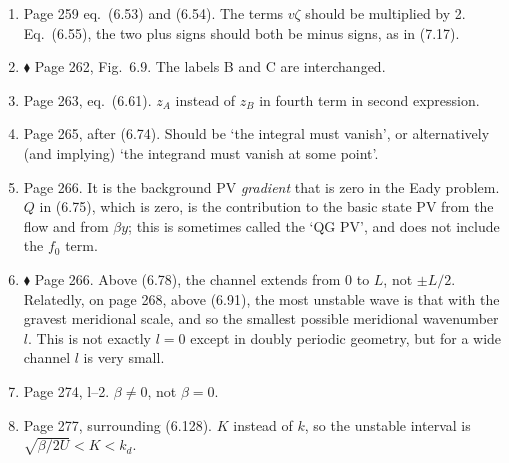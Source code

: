 \documentclass[10pt]{article}
\newcommand{\eq}{eq.\ } \newcommand{\Eq}{Eq.\ }
\renewcommand{\star}{\ensuremath{\blacklozenge} }
\begin{document}
\begin{enumerate}
\item Page 259 \eq (6.53) and (6.54). The terms $v \zeta$ should be multiplied by 2. \\ Eq.\ (6.55), the two plus signs should both be minus signs, as in (7.17).

\item \star \label{eadyschem} Page 262, Fig.\ 6.9. The labels {\sf B} and {\sf C} are interchanged.

\item Page 263, \eq (6.61). $z_A$ instead of $z_B$ in fourth term in second expression. 

\item Page 265, after (6.74). Should be `the integral must vanish', or alternatively (and implying) `the integrand must vanish at some point'. 


\item Page 266. It is the background PV \emph{gradient} that is zero in the Eady problem. $Q$ in (6.75), which is zero, is the contribution to the basic state PV from the flow and from $\beta y$; this is sometimes called the `QG PV', and does not include the $f_0$ term. 

\item \star \label{channel} Page 266. Above (6.78), the channel extends from $0$ to $L$, not $\pm L/2$. Relatedly, on page 268, above (6.91), the most unstable wave is that with the gravest meridional scale, and so the smallest possible meridional wavenumber $l$. This is not exactly $l=0$ except in doubly periodic geometry, but for a wide channel $l$ is very small.



\item Page 274, l--2. $\beta \neq 0$, not $\beta = 0$. 

\item Page 277, surrounding (6.128). $K$ instead of $k$, so the unstable interval is $\sqrt{\beta/2U} < K < k_d$.


\end{enumerate}
\end{document}
